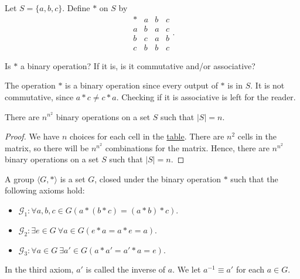     \begin{example}
        Let \(S = \{a, b, c\}\). Define \(*\) on \(S\) by
        \[
            \begin{array}{c|ccc}
                * & a & b & c \\ \hline
                a & b & a & c \\
                b & c & a & b \\
                c & b & b & c
            \end{array}.
        \]

        Is \(*\) a binary operation? If it is, is it commutative and/or associative?

        The operation \(*\) is a binary operation since every output of \(*\) is in \(S\). It is not commutative, since \(a*c \neq c*a\). Checking if it is associative is left for the reader. 
    \end{example}

    \begin{thm}
        There are \(n^{n^2}\) binary operations on a set \(S\) such that \(|S| = n\).
    \end{thm}

    \begin{proof}
        We have \(n\) choices for each cell in the \hyperref[exm:caytab]{table}. There are \(n^2\) cells in the matrix, so there will be \(n^{n^2}\) combinations for the matrix. Hence, there are \(n^{n^2}\) binary operations on a set \(S\) such that \(|S| = n\).
    \end{proof}

    \begin{dfn}[Group]
        A group \(\langle G, *\rangle\) is a set \(G\), closed under the binary operation \(*\) such that the following axioms hold:
        \begin{itemize}
            \item \(\mathcal{G}_1\!: \forall a,b,c\!\in\! G (a * (b * c) = (a * b) * c)\).
            \item \(\mathcal{G}_2\!: \exists e\!\in\! G\ \forall a\!\in\! G (e * a = a * e = a)\).
            \item \(\mathcal{G}_3\!: \forall a\!\in\! G\ \exists a'\!\in\! G (a * a' = a' * a = e)\).
        \end{itemize}

        In the third axiom, \(a'\) is called the inverse of \(a\). We let \(a^{-1} \equiv a'\) for each \(a\in G\).
    \end{dfn}

